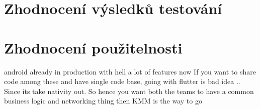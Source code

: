 

\section{Zhodnocení výsledků testování}

\section{Zhodnocení použitelnosti}

android already in production with hell a lot of features now If you want to share code among these and have single code base, going with flutter is bad idea .. Since its take nativity out. So hence you want both the teams to have a common business logic and networking thing then KMM is the way to go 
